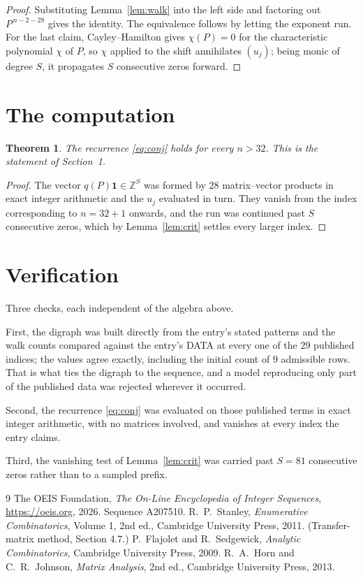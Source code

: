 \documentclass[11pt,a4paper]{article}
\theoremstyle{plain}
\newtheorem{theorem}{Theorem}
\theoremstyle{definition}
\begin{document}
\begin{proof}
Substituting Lemma~\ref{lem:walk} into the left side and factoring out
$P^{\,n-2-28}$ gives the identity. The equivalence follows by letting the exponent
run. For the last claim, Cayley--Hamilton gives $\chi(P)=0$ for the characteristic
polynomial $\chi$ of $P$, so $\chi$ applied to the shift annihilates $(u_j)$; being monic of
degree $S$, it propagates $S$ consecutive zeros forward.
\end{proof}

\section{The computation}

\begin{theorem}
The recurrence \eqref{eq:conj} holds for every $n>32$. This is the statement of
Section~1.
\end{theorem}

\begin{proof}
The vector $q(P)\mathbf{1}\in\mathbb{Z}^{S}$ was formed by $28$ matrix--vector
products in exact integer arithmetic and the $u_j$ evaluated in turn. They vanish from the
index corresponding to $n=32+1$ onwards, and the run was continued past $S$ consecutive
zeros, which by Lemma~\ref{lem:crit} settles every larger index.
\end{proof}

\section{Verification}

Three checks, each independent of the algebra above.

First, the digraph was built directly from the entry's stated patterns and the walk counts
compared against the entry's DATA at every one of the $29$ published indices; the
values agree exactly, including the initial count of $9$ admissible rows. That is
what ties the digraph to the sequence, and a model reproducing only part of the published
data was rejected wherever it occurred.

Second, the recurrence \eqref{eq:conj} was evaluated on those published terms in exact
integer arithmetic, with no matrices involved, and vanishes at every index the entry claims.

Third, the vanishing test of Lemma~\ref{lem:crit} was carried past $S=81$ consecutive
zeros rather than to a sampled prefix.

\begin{thebibliography}{9}
 The OEIS Foundation, \emph{The On-Line Encyclopedia of Integer
Sequences}, \url{https://oeis.org}, 2026. Sequence A207510.
 R.~P.~Stanley, \emph{Enumerative Combinatorics}, Volume 1, 2nd ed.,
Cambridge University Press, 2011. (Transfer-matrix method, Section 4.7.)
 P.~Flajolet and R.~Sedgewick, \emph{Analytic Combinatorics}, Cambridge
University Press, 2009.
 R.~A.~Horn and C.~R.~Johnson, \emph{Matrix Analysis}, 2nd ed., Cambridge
University Press, 2013.
\end{thebibliography}
\end{document}
